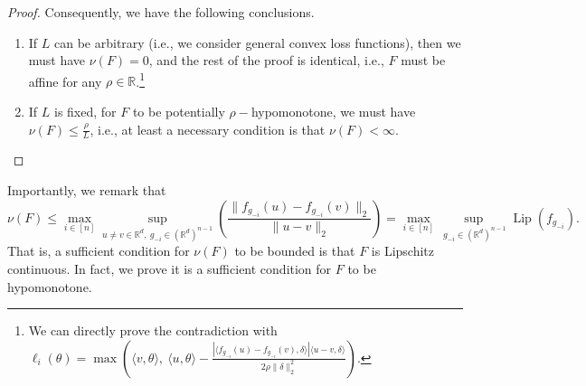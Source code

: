 \documentclass[twoside,11pt]{article}
\newcommand{\R}{\mathbb{R}}
\begin{document}
\begin{proof}
Consequently, we have the following conclusions.
\begin{enumerate}
    \item[\textit{(1)}] If $L$ can be arbitrary (i.e., we consider general convex loss functions), then we must have $\nu(F) = 0$, and the rest of the proof is identical, i.e., $F$ must be affine for any $\rho \in \R$.\footnote{We can directly prove the contradiction with $\ell_i(\theta) = \max \left( \langle v, \theta \rangle,\ \langle u, \theta \rangle - \frac{| \langle f_{g_{-i}}(u) - f_{g_{-i}}(v), \delta \rangle | \langle u - v, \delta \rangle}{2\rho\|\delta\|_2^2} \right)$.}
    \item[\textit{(2)}] If $L$ is fixed, for $F$ to be potentially $\rho-$hypomonotone, we must have $\nu(F) \leq \frac{\rho}{L}$, i.e., at least a necessary condition is that $\nu(F) < \infty$.
\end{enumerate}
\end{proof}
Importantly, we remark that
\begin{equation*}
    \nu(F) 
    \leq \max_{i\in[n]} \sup_{u \neq v \in \R^d,\ g_{-i} \in (\R^d)^{n-1}} \left( \frac{\|f_{g_{-i}}(u) - f_{g_{-i}}(v)\|_2}{\|u-v\|_2} \right)
    = \max_{i\in[n]} \sup_{\ g_{-i} \in (\R^d)^{n-1}} \operatorname{Lip}(f_{g_{-i}}).
\end{equation*}
That is, a sufficient condition for $\nu(F)$ to be bounded is that $F$ is Lipschitz continuous.  
In fact, we prove it is a sufficient condition for $F$ to be hypomonotone.
\end{document}
